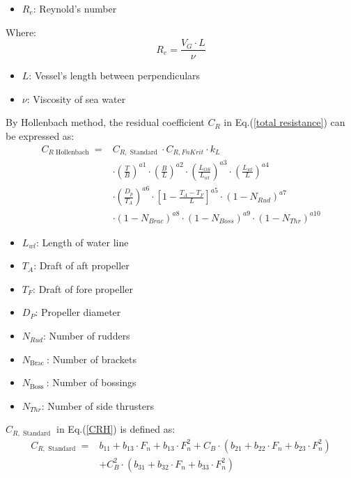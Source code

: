 \begin{itemize}
    \item $R_{e}$: Reynold's number
\end{itemize}
Where:
\begin{equation*}
    R_{e}=\frac{V_{G} \cdot L}{\nu}
\end{equation*}
\begin{itemize}
    \item $L$: Vessel's length between perpendiculars
    \item $\nu$: Viscosity of sea water
\end{itemize}
By Hollenbach method, the residual coefficient $C_{R}$ in Eq.(\ref{total resistance}) can be expressed as:
\begin{equation}
    \begin{aligned}
        C_{R \text { Hollenbach }}=&C_{R, \text { Standard }} \cdot C_{R, F n K r i t} \cdot k_{L}  \\
        &\cdot\left(\frac{T}{B}\right)^{a 1} \cdot\left(\frac{B}{L}\right)^{a 2} \cdot\left(\frac{L_{O S}}{L_{w l}}\right)^{a 3} \cdot\left(\frac{L_{w l}}{L}\right)^{a 4} \\
        &\cdot\left(\frac{D_{p}}{T_{A}}\right)^{a 6} \cdot\left[1-\frac{T_{A}-T_{F}}{L}\right]^{a 5} \cdot\left(1-N_{R u d}\right)^{a 7} \\
        &\cdot\left(1-N_{B r a c}\right)^{a 8} \cdot\left(1-N_{B o s s}\right)^{a 9} \cdot\left(1-N_{T h r}\right)^{a 10}
        \label{CRH}
    \end{aligned}
\end{equation}
\begin{itemize}
    \item $L_{wl}$: Length of water line
    \item $T_{A}$: Draft of aft propeller
    \item $T_{F}$: Draft of fore propeller
    \item $D_{P}$: Propeller diameter
    \item $N_{R u d}$: Number of rudders
    \item $N_{\text {Brac }}$: Number of brackets
    \item $N_{\text {Boss }}$: Number of bossings
    \item $N_{T h r}$: Number of side thrusters
\end{itemize}
$C_{R, \text { Standard }}$ in Eq.(\ref{CRH}) is defined as:
\begin{equation}
    \begin{aligned}
        C_{R, \text { Standard }}=&b_{11}+b_{13} \cdot F_{n}+b_{13} \cdot F_{n}^{2}+C_{B} \cdot\left(b_{21}+b_{22} \cdot F_{n}+b_{23} \cdot F_{n}^{2}\right)\\
        &+C_{B}^{2} \cdot\left(b_{31}+b_{32} \cdot F_{n}+b_{33} \cdot F_{n}^{2}\right)
    \end{aligned}
    \label{CRS}
\end{equation} 

